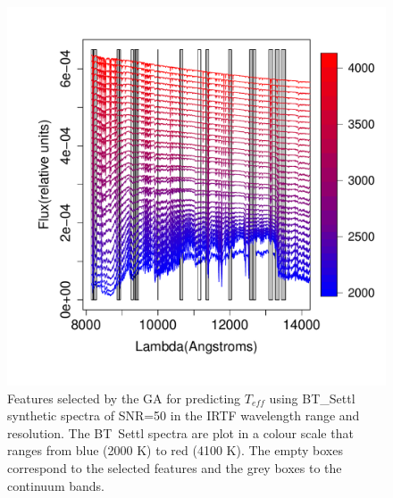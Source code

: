 \begin {figure}
 \centering
  \includegraphics[scale=0.55]{figs/BT-spectraAtIRTF-50-teff}
  \caption{Features selected by the GA for predicting $T_{eff}$ using
    BT\_Settl synthetic spectra of SNR=50 in the IRTF wavelength range
    and resolution. The BT\ Settl spectra are plot in a colour scale
    that ranges from blue (2000 K) to red (4100 K). The empty boxes
    correspond to the selected features and the grey boxes to the
    continuum bands.}
\label{fig:irtf-teff}
\end {figure}


